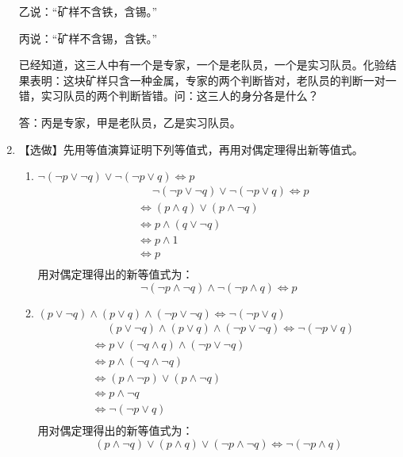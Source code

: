 \documentclass[UTF8]{ctexart}
\begin{document}
\begin{enumerate}
    乙说：“矿样不含铁，含锡。”
    
    丙说：“矿样不含锡，含铁。”
    
    已经知道，这三人中有一个是专家，一个是老队员，一个是实习队员。化验结果表明：这块矿样只含一种金属，专家的两个判断皆对，老队员的判断一对一错，实习队员的两个判断皆错。问：这三人的身分各是什么？
    
    答：丙是专家，甲是老队员，乙是实习队员。
    
    \item 【选做】先用等值演算证明下列等值式，再用对偶定理得出新等值式。
    \begin{enumerate}
        \item  $\neg (\neg p \vee  \neg q) \vee  \neg (\neg p \vee  q) \Leftrightarrow  p$
        \[
            \begin{aligned}
                &\mathrel{\phantom{=}} \neg (\neg p \vee  \neg q) \vee  \neg (\neg p \vee  q) \Leftrightarrow  p\\
                &\Leftrightarrow (p \wedge q)\vee(p\wedge \neg q)\\
                &\Leftrightarrow p\wedge (q\vee \neg q)\\
                &\Leftrightarrow p\wedge 1\\
                &\Leftrightarrow p\\
            \end{aligned}
        \]
        用对偶定理得出的新等值式为：
        \[
            \neg(\neg p\wedge \neg q)\wedge \neg (\neg p \wedge q)\Leftrightarrow p
        \]
    
        \item  $( p \vee  \neg q) \wedge  ( p \vee  q) \wedge  (\neg p \vee  \neg q) \Leftrightarrow  \neg (\neg p \vee  q)$
        \[
            \begin{aligned}
                &\mathrel{\phantom{=}} ( p \vee  \neg q) \wedge  ( p \vee  q) \wedge  (\neg p \vee  \neg q) \Leftrightarrow  \neg (\neg p \vee  q)\\
                &\Leftrightarrow p\vee (\neg q \wedge q) \wedge(\neg p \vee \neg q)\\
                &\Leftrightarrow p\wedge (\neg q \wedge \neg q)\\
                &\Leftrightarrow (p \wedge \neg p)\vee (p \wedge \neg q)\\
                &\Leftrightarrow p \wedge \neg q\\
                &\Leftrightarrow \neg(\neg p \vee q)\\
            \end{aligned}
        \]
        用对偶定理得出的新等值式为：
        \[
            ( p \wedge  \neg q) \vee  ( p \wedge  q) \vee  (\neg p \wedge  \neg q) \Leftrightarrow  \neg (\neg p \wedge  q)
        \]
        

\end{enumerate}
\end{enumerate}
\end{document}
